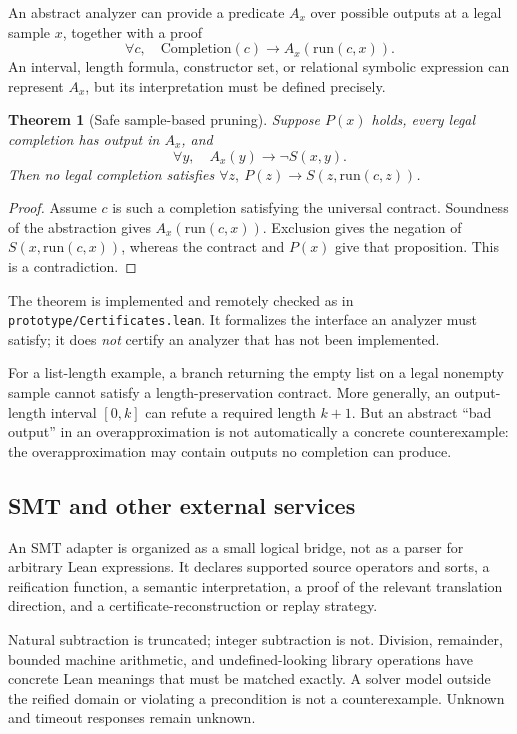 \documentclass[11pt,a4paper]{article}
\newcommand{\code}[1]{\texttt{\detokenize{#1}}}
\newcommand{\File}[1]{\nolinkurl{#1}}
\newtheorem{theorem}[definition]{Theorem}
\theoremstyle{remark}
\begin{document}
An abstract analyzer can provide a predicate $A_x$ over possible outputs at a legal sample $x$, together with a proof
\[
 \forall c,\quad\mathrm{Completion}(c)\to A_x(\mathrm{run}(c,x)).
\]
An interval, length formula, constructor set, or relational symbolic expression can represent $A_x$, but its interpretation must be defined precisely.

\begin{theorem}[Safe sample-based pruning]\label{thm:pruning}
Suppose $P(x)$ holds, every legal completion has output in $A_x$, and
\[
 \forall y,\quad A_x(y)\to\neg S(x,y).
\]
Then no legal completion satisfies $\forall z,\ P(z)\to S(z,\mathrm{run}(c,z))$.
\end{theorem}
\begin{proof}
Assume $c$ is such a completion satisfying the universal contract. Soundness of the abstraction gives $A_x(\mathrm{run}(c,x))$. Exclusion gives the negation of $S(x,\mathrm{run}(c,x))$, whereas the contract and $P(x)$ give that proposition. This is a contradiction.
\end{proof}

The theorem is implemented and remotely checked as \code{safePruneAt} in \File{prototype/Certificates.lean}. It formalizes the interface an analyzer must satisfy; it does \emph{not} certify an analyzer that has not been implemented.

For a list-length example, a branch returning the empty list on a legal nonempty sample cannot satisfy a length-preservation contract. More generally, an output-length interval $[0,k]$ can refute a required length $k+1$. But an abstract ``bad output'' in an overapproximation is not automatically a concrete counterexample: the overapproximation may contain outputs no completion can produce.

\subsection{SMT and other external services}

An SMT adapter is organized as a small logical bridge, not as a parser for arbitrary Lean expressions. It declares supported source operators and sorts, a reification function, a semantic interpretation, a proof of the relevant translation direction, and a certificate-reconstruction or replay strategy.

Natural subtraction is truncated; integer subtraction is not. Division, remainder, bounded machine arithmetic, and undefined-looking library operations have concrete Lean meanings that must be matched exactly. A solver model outside the reified domain or violating a precondition is not a counterexample. Unknown and timeout responses remain unknown.
\end{document}
